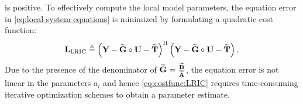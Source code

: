 is positive.
To effectively compute the local model parameters, the equation error in \eqref{eq:local-system-equations} is minimized by formulating a quadratic cost function:
\begin{equation}
  \mathbf{L_{\mathrm{LRIC}}} 
    \triangleq 
      \left( \mathbf{Y}  -  \widetilde{\mathbf{G}} \circ \mathbf{U} - \widetilde{\mathbf{T}} \right)^{\mathrm{H}} 
      \left( \mathbf{Y}  -  \widetilde{\mathbf{G}} \circ \mathbf{U} - \widetilde{\mathbf{T}} \right)
   \label{eq:costfunc:LRIC}
   \text{.}
\end{equation}
Due to the presence of the denominator of $\widetilde{\mathbf{G}} = \frac{\widetilde{\mathbf{B}}}{\widetilde{\mathbf{A}}}$, the equation error is not linear in the parameters $a_i$ and hence \eqref{eq:costfunc:LRIC} requires time-consuming iterative optimization schemes to obtain a parameter estimate.


